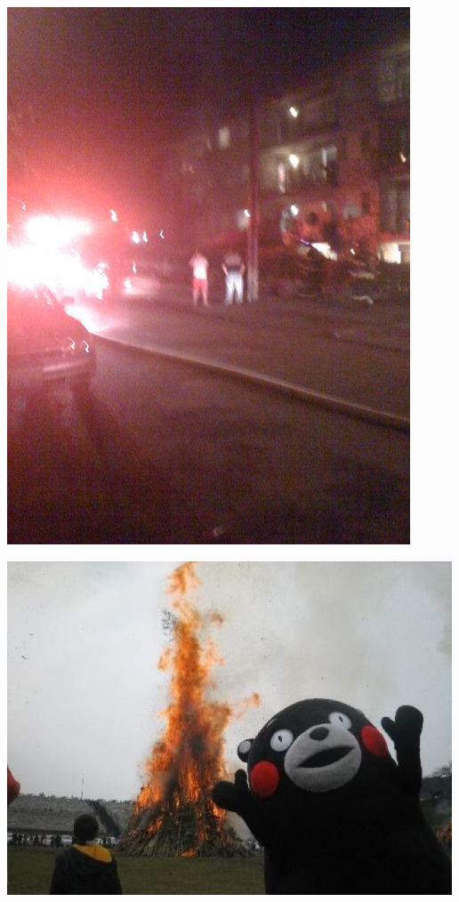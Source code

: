 \documentclass{beamer}
\begin{document}
\begin{frame}
  \begin{center}
    \includegraphics[width=\textwidth,height=0.8\textheight,keepaspectratio=true]{seattle_fire}
  \end{center}
\end{frame}

\begin{frame}
  \begin{center}
    \includegraphics[width=\textwidth,height=0.8\textheight,keepaspectratio=true]{japan_fire}
  \end{center}
\end{frame}
\end{document}
